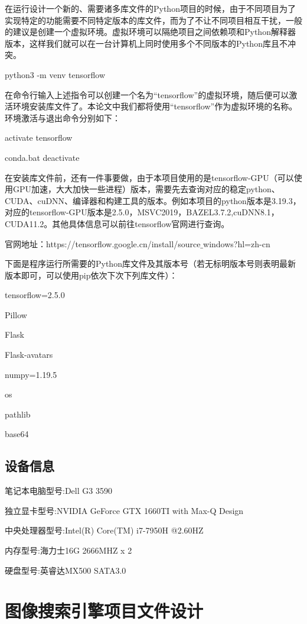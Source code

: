 \documentclass[bachelor_p]{hdu-thesis}
\begin{document}
在运行设计一个新的、需要诸多库文件的Python项目的时候，由于不同项目为了实现特定的功能需要不同特定版本的库文件，而为了不让不同项目相互干扰，一般的建议是创建一个虚拟环境。虚拟环境可以隔绝项目之间依赖项和Python解释器版本，这样我们就可以在一台计算机上同时使用多个不同版本的Python库且不冲突。

python3 -m venv tensorflow

在命令行输入上述指令可以创建一个名为“tensorflow”的虚拟环境，随后便可以激活环境安装库文件了。本论文中我们都将使用“tensorflow”作为虚拟环境的名称。环境激活与退出命令分别如下：

activate tensorflow

conda.bat deactivate

在安装库文件前，还有一件事要做，由于本项目使用的是tensorflow-GPU（可以使用GPU加速，大大加快一些进程）版本，需要先去查询对应的稳定python、CUDA、cuDNN、编译器和构建工具的版本。例如本项目的python版本是3.19.3，对应的tensorflow-GPU版本是2.5.0，MSVC2019，BAZEL3.7.2,cuDNN8.1，CUDA11.2。其他具体信息可以前往tensorflow官网进行查询。

官网地址：https://tensorflow.google.cn/install/source$\_$windows?hl=zh-cn

下面是程序运行所需要的Python库文件及其版本号（若无标明版本号则表明最新版本即可，可以使用pip依次下次下列库文件）：

tensorflow=2.5.0

Pillow

Flask

Flask-avatars

numpy=1.19.5

os

pathlib

base64

\subsection{设备信息}

笔记本电脑型号:Dell G3 3590

独立显卡型号:NVIDIA GeForce GTX 1660TI with Max-Q Design

中央处理器型号:Intel(R) Core(TM) i7-7950H @2.60HZ

内存型号:海力士16G 2666MHZ x 2

硬盘型号:英睿达MX500 SATA3.0 

\section{图像搜索引擎项目文件设计}
\end{document}
